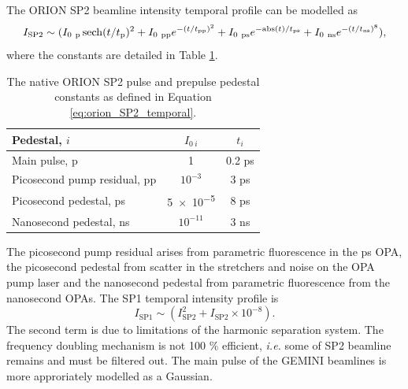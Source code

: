 The ORION SP2 beamline intensity temporal profile can be modelled as
\begin{equation}\label{eq:orion_SP2_temporal}
	I_\mathrm{SP2} \sim (I_{0 \ \mathrm{p}}\sech(t/t_\mathrm{p})^2 + I_{0 \ \mathrm{pp}}e^{-(t/t_\mathrm{pp})^2} + I_{0 \ \mathrm{ps}}e^{-\mathrm{abs}(t)/t_\mathrm{ps}} + I_{0 \ \mathrm{ns}}e^{-(t/t_\mathrm{ns})^8}),
\end{equation}
where the constants are detailed in Table \ref{tab:orion_pedestals}.
\begin{table}[]
	\centering
	\begin{tabular}{lcc}
		\hline\hline
		Pedestal, $i$                & $I_{0 \ i}$ & $t_i$  \\ \hline
		Main pulse, p                & 1           & 0.2 ps \\
		Picosecond pump residual, pp & $10^{-3}$   & 3 ps   \\
		Picosecond pedestal, ps      & \num{5e-5}  & 8 ps   \\
		Nanosecond pedestal, ns      & $10^{-11}$  & 3 ns  \\ \hline \hline
	\end{tabular}
	\caption{The native ORION SP2 pulse and prepulse pedestal constants as defined in Equation \ref{eq:orion_SP2_temporal}.}
	\label{tab:orion_pedestals}
\end{table}
The picosecond pump residual arises from parametric fluorescence in the ps OPA, the picosecond pedestal from scatter in the stretchers and noise on the OPA pump laser and the nanosecond pedestal from parametric fluorescence from the nanosecond OPAs. 
The SP1 temporal intensity profile is
\begin{equation}
	I_\mathrm{SP1} \sim (I_\mathrm{SP2}^2 + I_\mathrm{SP2} \times 10^{-8}).
\end{equation}
The second term is due to limitations of the harmonic separation system. The frequency doubling mechanism is not 100 \% efficient, \textit{i.e.} some of SP2 beamline remains and must be filtered out. The main pulse of the GEMINI beamlines is more approriately modelled as a Gaussian.

